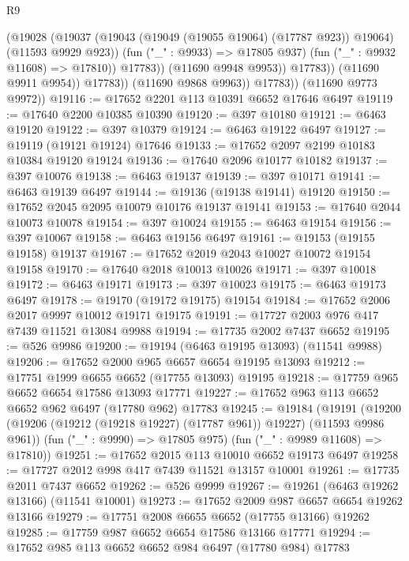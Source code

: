 \begin{lexlean}{R9}
\begin{coremodule}
{{{{{{{{{{{{{{{{{{{{{{{{{{{{{{{{{{{{{{{{{{{{{{{{{{{{{{{{{{{{{{{{{{{{{{{{{{{{{{{{{{{{                            (@19028
                              (@19037
                                (@19043 (@19049 (@19055 @19064) (@17787 @923)) @19064)
                                (@11593 @9929 @923))
                              (fun ("_" : @9933) => @17805 @937)
                              (fun ("_" : @9932 @11608) => @17810))
                            @17783))
                        (@11690 @9948 @9953))
                      @17783))
                  (@11690 @9911 @9954))
                @17783))
            (@11690 @9868 @9963))
          @17783))
      (@11690 @9773 @9972))
@19116 := @17652 @2201 @113 @10391 @6652 @17646 @6497
@19119 := @17640 @2200 @10385 @10390
@19120 := @397 @10180
@19121 := @6463 @19120
@19122 := @397 @10379
@19124 := @6463 @19122 @6497
@19127 := @19119 (@19121 @19124) @17646
@19133 := @17652 @2097 @2199 @10183 @10384 @19120 @19124
@19136 := @17640 @2096 @10177 @10182
@19137 := @397 @10076
@19138 := @6463 @19137
@19139 := @397 @10171
@19141 := @6463 @19139 @6497
@19144 := @19136 (@19138 @19141) @19120
@19150 := @17652 @2045 @2095 @10079 @10176 @19137 @19141
@19153 := @17640 @2044 @10073 @10078
@19154 := @397 @10024
@19155 := @6463 @19154
@19156 := @397 @10067
@19158 := @6463 @19156 @6497
@19161 := @19153 (@19155 @19158) @19137
@19167 := @17652 @2019 @2043 @10027 @10072 @19154 @19158
@19170 := @17640 @2018 @10013 @10026
@19171 := @397 @10018
@19172 := @6463 @19171
@19173 := @397 @10023
@19175 := @6463 @19173 @6497
@19178 := @19170 (@19172 @19175) @19154
@19184 := @17652 @2006 @2017 @9997 @10012 @19171 @19175
@19191 := @17727 @2003 @976 @417 @7439 @11521 @13084 @9988
@19194 := @17735 @2002 @7437 @6652
@19195 := @526 @9986
@19200 := @19194 (@6463 @19195 @13093) (@11541 @9988)
@19206 := @17652 @2000 @965 @6657 @6654 @19195 @13093
@19212 := @17751 @1999 @6655 @6652 (@17755 @13093) @19195
@19218 := @17759 @965 @6652 @6654 @17586 @13093 @17771
@19227 := @17652 @963 @113 @6652 @6652 @962 @6497 (@17780 @962) @17783
@19245 := @19184
    (@19191
      (@19200 (@19206 (@19212 (@19218 @19227) (@17787 @961)) @19227) (@11593 @9986 @961))
      (fun ("_" : @9990) => @17805 @975)
      (fun ("_" : @9989 @11608) => @17810))
@19251 := @17652 @2015 @113 @10010 @6652 @19173 @6497
@19258 := @17727 @2012 @998 @417 @7439 @11521 @13157 @10001
@19261 := @17735 @2011 @7437 @6652
@19262 := @526 @9999
@19267 := @19261 (@6463 @19262 @13166) (@11541 @10001)
@19273 := @17652 @2009 @987 @6657 @6654 @19262 @13166
@19279 := @17751 @2008 @6655 @6652 (@17755 @13166) @19262
@19285 := @17759 @987 @6652 @6654 @17586 @13166 @17771
@19294 := @17652 @985 @113 @6652 @6652 @984 @6497 (@17780 @984) @17783
}}}}}}}}}}}}}}}}}}}}}}}}}}}}}}}}}}}}}}}}}}}}}}}}}}}}}}}}}}}}}}}}}}}}}}}}}}}}}}}}}}}}
\end{coremodule}
\end{lexlean}
